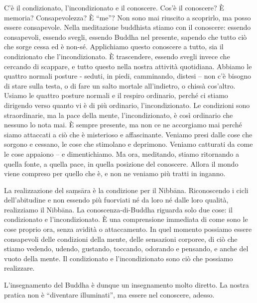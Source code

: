 C'è il condizionato, l'incondizionato e il conoscere. Cos'è il
conoscere? È memoria? Consapevolezza? È ``me''? Non sono mai riuscito a
scoprirlo, ma posso essere consapevole. Nella meditazione buddhista
stiamo con il conoscere: essendo consapevoli, essendo svegli, essendo
Buddha nel presente, sapendo che tutto ciò che sorge cessa ed è non-sé.
Applichiamo questo conoscere a tutto, sia il condizionato che
l'incondizionato. È trascendere, essendo svegli invece che cercando di
scappare, e tutto questo nella nostra attività quotidiana. Abbiamo le
quattro normali posture - seduti, in piedi, camminando, distesi -- non
c'è bisogno di stare sulla testa, o di fare un salto mortale
all'indietro, o chissà cos'altro. Usiamo le quattro posture normali e il
respiro ordinario, perché ci stiamo dirigendo verso quanto vi è di più
ordinario, l'incondizionato. Le condizioni sono straordinarie, ma la
pace della mente, l'incondizionato, è così ordinario che nessuno lo nota
mai. È sempre presente, ma non ce ne accorgiamo mai perché siamo
attaccati a ciò che è misterioso e affascinante. Veniamo presi dalle
cose che sorgono e cessano, le cose che stimolano e deprimono. Veniamo
catturati da come le cose appaiono -- e dimentichiamo. Ma ora,
meditando, stiamo ritornando a quella fonte, a quella pace, in quella
posizione del conoscere. Allora il mondo viene compreso per quello che
è, e non ne veniamo più tratti in inganno.

La realizzazione del saṃsāra è la condizione per il Nibbāna.
Riconoscendo i cicli dell'abitudine e non essendo più fuorviati né da
loro né dalle loro qualità, realizziamo il Nibbāna. La
conoscenza-di-Buddha riguarda solo due cose: il condizionato e
l'incondizionato. È una comprensione immediata di come sono le cose
proprio ora, senza avidità o attaccamento. In quel momento possiamo
essere consapevoli delle condizioni della mente, delle sensazioni
corporee, di ciò che stiamo vedendo, udendo, gustando, toccando,
odorando e pensando, e anche del vuoto della mente. Il condizionato e
l'incondizionato sono ciò che possiamo realizzare.

L'insegnamento del Buddha è dunque un insegnamento molto diretto. La
nostra pratica non è
\protect\hypertarget{__DdeLink__344_1647893245}{}{}``diventare
illuminati'', ma essere nel conoscere, adesso.
